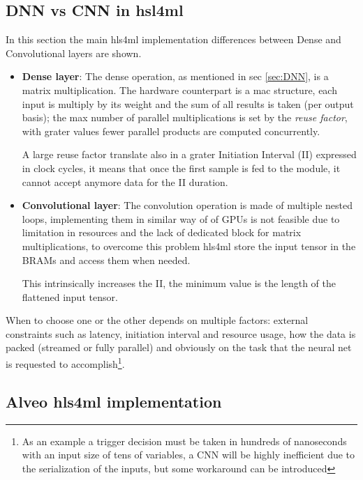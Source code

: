 \documentclass[../../main.tex]{subfiles}
\begin{document}
\subsection{DNN vs CNN in hsl4ml}
\label{sec:hls4ml_DNNvCNN}
In this section the main hls4ml implementation differences between Dense and Convolutional layers are shown.
\begin{itemize}
    \item \textbf{Dense layer}: The dense operation, as mentioned in sec \ref{sec:DNN}, is a matrix multiplication. The hardware counterpart is a \acrfull{mac} structure, each input is multiply by its weight and the sum of all results is taken (per output basis); the max number of parallel multiplications is set by the \textit{reuse factor}, with grater values fewer parallel products are computed concurrently\cite{hls4ml-DNN}.  
    
    A large reuse factor translate also in a grater Initiation Interval (II) expressed in clock cycles, it means that once the first sample is fed to the module, it cannot accept anymore data for the II duration.  
    
    \item \textbf{Convolutional layer}: The convolution operation is made of multiple nested loops, implementing them in similar way of of GPUs is not feasible due to limitation in resources and the lack of dedicated block for matrix multiplications, to overcome this problem hls4ml store the input tensor in the BRAMs and access them when needed\cite{hls4ml-CNN}.  
    
    This intrinsically increases the II, the minimum value is the length of the flattened input tensor.  
\end{itemize}

When to choose one or the other depends on multiple factors: external constraints such as latency, initiation interval  and resource usage, how the data is packed (streamed or fully parallel) and obviously on the task that the neural net is requested to accomplish\footnote{As an example a trigger decision must be taken in hundreds of nanoseconds with an input size of tens of variables, a CNN will be highly inefficient due to the serialization of the inputs, but some workaround can be introduced}.

\subsection{Alveo hls4ml implementation}
\label{sec:FPGA_alveo}
\end{document}
